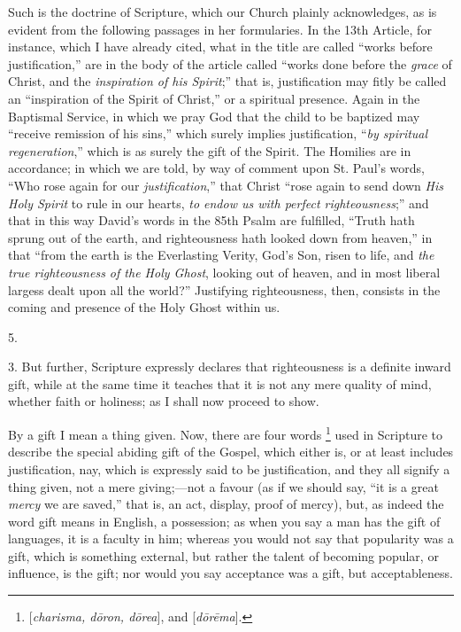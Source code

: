 Such is the doctrine of Scripture, which our Church plainly
acknowledges, as is evident from the following passages in her
formularies. In the 13th Article, for instance, which I have already
cited, what in the title are called ``works before
justification,'' are in the body of the article called ``works
done before the \emph{grace} of Christ, and the \emph{inspiration
of his Spirit};'' that is, justification may fitly be called an
``inspiration of the Spirit of Christ,'' or a spiritual
presence. Again in the Baptismal Service, in which we pray God that
the child to be baptized may ``receive remission of his
sins,'' which surely implies justification, ``\emph{by spiritual
regeneration},'' which is as surely the gift of the Spirit. The
Homilies are in accordance; in which we are told, by way of comment
upon St. Paul's words, ``Who rose again for our \emph{justification},''
that Christ ``rose again to send down \emph{His Holy Spirit} to
rule in our hearts, \emph{to endow us with perfect righteousness};''
and that in this way David's words in the 85th Psalm are fulfilled,
``Truth hath sprung out of the earth, and righteousness hath
looked down from heaven,'' in that ``from the earth is the
Everlasting Verity, God's Son, risen to life, and \emph{the true
righteousness of the Holy Ghost}, looking out of heaven, and in
most liberal largess dealt upon all the world?'' Justifying
righteousness, then, consists in the coming and presence of the Holy
Ghost within us.

5.

3. But further, Scripture expressly declares that righteousness is
a definite inward gift, while at the same time it teaches that it is
not any mere quality of mind, whether faith or holiness; as I shall
now proceed to show.

By a gift I mean a thing given. Now, there are four words \footnote{[\emph{charisma, d\={o}ron,
d\={o}rea}], and [\emph{d\={o}r\={e}ma}].} used in Scripture to describe the special abiding gift of the
Gospel, which either is, or at least includes justification,
nay, which is expressly said to be justification, and they all signify
a thing given, not a mere giving;—not a favour (as if we should say,
``it is a great \emph{mercy} we are saved,'' that is, an act,
display, proof of mercy), but, as indeed the word gift means in
English, a possession; as when you say a man has the gift of
languages, it is a faculty in him; whereas you would not say that
popularity was a gift, which is something external, but rather the
talent of becoming popular, or influence, is the gift; nor would you
say acceptance was a gift, but acceptableness.

